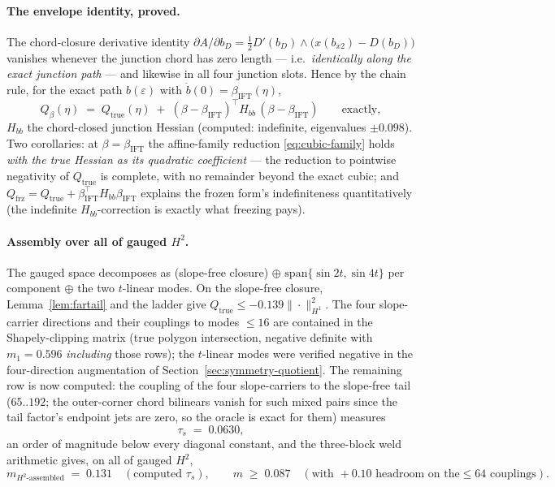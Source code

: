 \documentclass[11pt]{amsart}
\theoremstyle{plain}
\theoremstyle{definition}
\begin{document}
\paragraph{The envelope identity, proved.}
The chord-closure derivative identity
$\partial A/\partial b_{D} = \tfrac12 D'(b_{D})\wedge
\bigl(x(b_{x2})-D(b_{D})\bigr)$ vanishes whenever the junction chord
has zero length --- i.e.\ \emph{identically along the exact junction
path} --- and likewise in all four junction slots.  Hence by the
chain rule, for the exact path $b(\varepsilon)$ with
$\dot b(0)=\beta_{\mathrm{IFT}}(\eta)$,
\begin{equation}\label{eq:envelope-identity}
   Q_{\beta}(\eta) \;=\; Q_{\mathrm{true}}(\eta)
   \;+\; (\beta-\beta_{\mathrm{IFT}})^{\top} H_{bb}\,
         (\beta-\beta_{\mathrm{IFT}})
   \qquad\text{exactly},
\end{equation}
$H_{bb}$ the chord-closed junction Hessian (computed: indefinite,
eigenvalues $\pm0.098$).  Two corollaries: at
$\beta = \beta_{\mathrm{IFT}}$ the affine-family reduction
\eqref{eq:cubic-family} holds \emph{with the true Hessian as its
quadratic coefficient} --- the reduction to pointwise negativity of
$Q_{\mathrm{true}}$ is complete, with no remainder beyond the exact
cubic; and $Q_{\mathrm{frz}} = Q_{\mathrm{true}} +
\beta_{\mathrm{IFT}}^{\top}H_{bb}\beta_{\mathrm{IFT}}$ explains the
frozen form's indefiniteness quantitatively (the indefinite
$H_{bb}$-correction is exactly what freezing pays).

\paragraph{Assembly over all of gauged $H^{2}$.}
The gauged space decomposes as (slope-free closure) $\oplus$
$\mathrm{span}\{\sin2t,\sin4t\}$ per component $\oplus$ the two
$t$-linear modes.  On the slope-free closure,
Lemma~\ref{lem:fartail} and the ladder give
$Q_{\mathrm{true}}\leq-0.139\|\cdot\|^{2}_{H^{1}}$.  The four
slope-carrier directions and their couplings to modes $\leq16$ are
contained in the Shapely-clipping matrix (true polygon intersection,
negative definite with $m_{1}=0.596$ \emph{including} those rows);
the $t$-linear modes were verified negative in the four-direction
augmentation of Section~\ref{sec:symmetry-quotient}.  The remaining
row is now computed: the coupling of the four slope-carriers to the
slope-free tail ($65..192$; the outer-corner chord bilinears vanish
for such mixed pairs since the tail factor's endpoint jets are zero,
so the oracle is exact for them) measures
\[
   \tau_{s} \;=\; 0.0630 ,
\]
an order of magnitude below every diagonal constant, and the
three-block weld arithmetic gives, on all of gauged $H^{2}$,
\[
   m_{H^{2}\text{-assembled}} \;=\; 0.131
   \quad(\text{computed } \tau_{s}),
   \qquad
   m \;\geq\; 0.087
   \quad(\text{with } +0.10 \text{ headroom on the} \leq64
   \text{ couplings}).
\]
\end{document}
